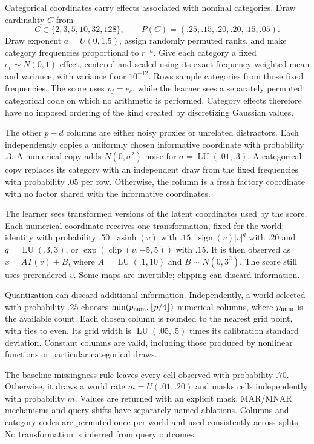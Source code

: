 \documentclass[11pt]{article}
\begin{document}
Categorical coordinates carry effects associated with nominal categories. Draw cardinality $C$ from
\[ C\in\{2,3,5,10,32,128\},\qquad P(C)=(.25,.15,.20,.20,.15,.05).\]
Draw exponent $a=U(0,1.5)$, assign randomly permuted ranks, and make category frequencies proportional to $r^{-a}$. Give each category a fixed $e_c\sim N(0,1)$ effect, centered and scaled using its exact frequency-weighted mean and variance, with variance floor $10^{-12}$. Rows sample categories from those fixed frequencies. The score uses $v_j=e_c$, while the learner sees a separately permuted categorical code on which no arithmetic is performed. Category effects therefore have no imposed ordering of the kind created by discretizing Gaussian values.

The other $p-d$ columns are either noisy proxies or unrelated distractors. Each independently copies a uniformly chosen informative coordinate with probability $.3$. A numerical copy adds $N(0,\sigma^2)$ noise for $\sigma=\operatorname{LU}(.01,.3)$. A categorical copy replaces its category with an independent draw from the fixed frequencies with probability $.05$ per row. Otherwise, the column is a fresh factory coordinate with no factor shared with the informative coordinates.

The learner sees transformed versions of the latent coordinates used by the score. Each numerical coordinate receives one transformation, fixed for the world: identity with probability $.50$, $\operatorname{asinh}(v)$ with $.15$, $\operatorname{sign}(v)|v|^q$ with $.20$ and $q=\operatorname{LU}(.3,3)$, or $\exp(\operatorname{clip}(v,-5,5))$ with $.15$. It is then observed as $x=A T(v)+B$, where $A=\operatorname{LU}(.1,10)$ and $B\sim N(0,3^2)$. The score still uses prerendered $v$. Some maps are invertible; clipping can discard information.

Quantization can discard additional information. Independently, a world selected with probability $.25$ chooses $\min(p_{\rm num},\lfloor p/4\rfloor)$ numerical columns, where $p_{\rm num}$ is the available count. Each chosen column is rounded to the nearest grid point, with ties to even. Its grid width is $\operatorname{LU}(.05,.5)$ times its calibration standard deviation. Constant columns are valid, including those produced by nonlinear functions or particular categorical draws.

The baseline missingness rule leaves every cell observed with probability $.70$. Otherwise, it draws a world rate $m=U(.01,.20)$ and masks cells independently with probability $m$. Values are returned with an explicit mask. MAR/MNAR mechanisms and query shifts have separately named ablations. Columns and category codes are permuted once per world and used consistently across splits. No transformation is inferred from query outcomes.
\end{document}
